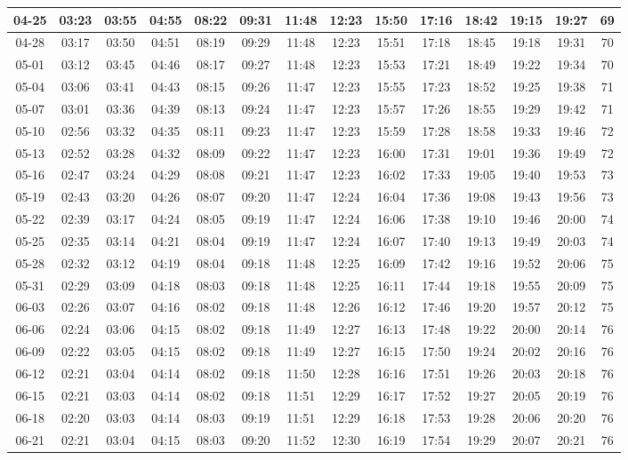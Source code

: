 \begin{footnotesize}
\begin{longtable}{c | c | c | c | c | c | c | c | c | c | c | c | c | c}
		04-25&03:23&03:55&04:55&08:22&09:31&11:48&12:23&15:50&17:16&18:42&19:15&19:27&69\\\hline
		04-28&03:17&03:50&04:51&08:19&09:29&11:48&12:23&15:51&17:18&18:45&19:18&19:31&70\\\hline
		05-01&03:12&03:45&04:46&08:17&09:27&11:48&12:23&15:53&17:21&18:49&19:22&19:34&70\\\hline
		05-04&03:06&03:41&04:43&08:15&09:26&11:47&12:23&15:55&17:23&18:52&19:25&19:38&71\\\hline
		05-07&03:01&03:36&04:39&08:13&09:24&11:47&12:23&15:57&17:26&18:55&19:29&19:42&71\\\hline
		05-10&02:56&03:32&04:35&08:11&09:23&11:47&12:23&15:59&17:28&18:58&19:33&19:46&72\\\hline
		05-13&02:52&03:28&04:32&08:09&09:22&11:47&12:23&16:00&17:31&19:01&19:36&19:49&72\\\hline
		05-16&02:47&03:24&04:29&08:08&09:21&11:47&12:23&16:02&17:33&19:05&19:40&19:53&73\\\hline
		05-19&02:43&03:20&04:26&08:07&09:20&11:47&12:24&16:04&17:36&19:08&19:43&19:56&73\\\hline
		05-22&02:39&03:17&04:24&08:05&09:19&11:47&12:24&16:06&17:38&19:10&19:46&20:00&74\\\hline
		05-25&02:35&03:14&04:21&08:04&09:19&11:47&12:24&16:07&17:40&19:13&19:49&20:03&74\\\hline
		05-28&02:32&03:12&04:19&08:04&09:18&11:48&12:25&16:09&17:42&19:16&19:52&20:06&75\\\hline
		05-31&02:29&03:09&04:18&08:03&09:18&11:48&12:25&16:11&17:44&19:18&19:55&20:09&75\\\hline
		06-03&02:26&03:07&04:16&08:02&09:18&11:48&12:26&16:12&17:46&19:20&19:57&20:12&75\\\hline
		06-06&02:24&03:06&04:15&08:02&09:18&11:49&12:27&16:13&17:48&19:22&20:00&20:14&76\\\hline
		06-09&02:22&03:05&04:15&08:02&09:18&11:49&12:27&16:15&17:50&19:24&20:02&20:16&76\\\hline
		06-12&02:21&03:04&04:14&08:02&09:18&11:50&12:28&16:16&17:51&19:26&20:03&20:18&76\\\hline
		06-15&02:21&03:03&04:14&08:02&09:18&11:51&12:29&16:17&17:52&19:27&20:05&20:19&76\\\hline
		06-18&02:20&03:03&04:14&08:03&09:19&11:51&12:29&16:18&17:53&19:28&20:06&20:20&76\\\hline
		06-21&02:21&03:04&04:15&08:03&09:20&11:52&12:30&16:19&17:54&19:29&20:07&20:21&76\\\hline

\end{longtable}
\end{footnotesize}
